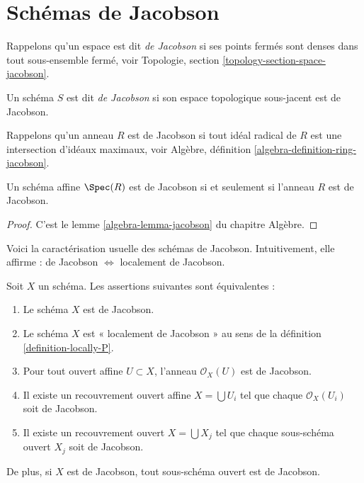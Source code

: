 \section{Schémas de Jacobson}
\label{section-jacobson}

\noindent
Rappelons qu'un espace est dit {\it de Jacobson} si ses points fermés sont
denses dans tout sous-ensemble fermé, voir
Topologie, section \ref{topology-section-space-jacobson}.

\begin{definition}
\label{definition-jacobson}
Un schéma $S$ est dit {\it de Jacobson} si son espace topologique
sous-jacent est de Jacobson.
\end{definition}

\noindent
Rappelons qu'un anneau $R$ est de Jacobson si tout idéal radical de $R$
est une intersection d'idéaux maximaux, voir
Algèbre, définition \ref{algebra-definition-ring-jacobson}.

\begin{lemma}
\label{lemma-affine-jacobson}
Un schéma affine $\Spec(R)$ est de Jacobson si et seulement si
l'anneau $R$ est de Jacobson.
\end{lemma}

\begin{proof}
C'est le lemme \ref{algebra-lemma-jacobson} du chapitre Algèbre.
\end{proof}

\noindent
Voici la caractérisation usuelle des schémas de Jacobson.
Intuitivement, elle affirme : de Jacobson $\Leftrightarrow$ localement de Jacobson.

\begin{lemma}
\label{lemma-locally-jacobson}
Soit $X$ un schéma. Les assertions suivantes sont équivalentes :
\begin{enumerate}
\item Le schéma $X$ est de Jacobson.
\item Le schéma $X$ est « localement de Jacobson » au sens de la
définition \ref{definition-locally-P}.
\item Pour tout ouvert affine $U \subset X$, l'anneau $\mathcal{O}_X(U)$
est de Jacobson.
\item Il existe un recouvrement ouvert affine $X = \bigcup U_i$ tel que
chaque $\mathcal{O}_X(U_i)$ soit de Jacobson.
\item Il existe un recouvrement ouvert $X = \bigcup X_j$
tel que chaque sous-schéma ouvert $X_j$ soit de Jacobson.
\end{enumerate}
De plus, si $X$ est de Jacobson, tout sous-schéma ouvert
est de Jacobson.
\end{lemma}

